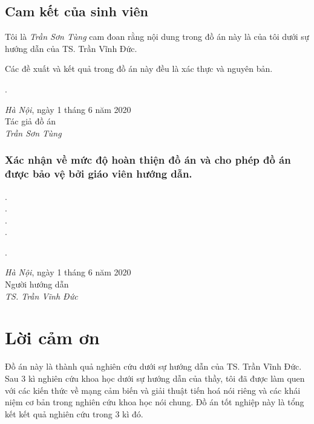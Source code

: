 \documentclass{hust}
\begin{document}
\newpage

\section*{Cam kết của sinh viên}
Tôi là \textit{Trần Sơn Tùng} cam đoan rằng nội dung trong đồ án này là của tôi dưới sự hướng dẫn của TS. Trần Vĩnh Đức.

Các đề xuất và kết quả trong đồ án này đều là xác thực và nguyên bản.
\begin{minipage}{0.5\textwidth}
	.
\end{minipage}
\begin{minipage}[t]{0.5\textwidth}
	
	
	
	\begin{center}
		\textit{Hà Nội}, ngày 1 tháng 6 năm 2020\\
		Tác giả đồ án\\[3cm]
		
		\textit{Trần Sơn Tùng}
	\end{center}
\end{minipage}
\subsection*{Xác nhận về mức độ hoàn thiện đồ án và cho phép đồ án được bảo vệ bởi giáo viên hướng dẫn.}
.\dotfill \\
.\dotfill \\ 
.\dotfill \\ 
.\dotfill \\
\begin{minipage}{0.5\textwidth}
	.
\end{minipage}
\begin{minipage}[t]{0.5\textwidth}
	
	\begin{center}
		\textit{Hà Nội}, ngày 1 tháng 6 năm 2020\\
		Người hướng dẫn\\[3cm]
		
		\textit{TS. Trần Vĩnh Đức}
	\end{center}
\end{minipage}

\pagebreak

\chapter*{Lời cảm ơn}
Đồ án này là thành quả nghiên cứu dưới sự hướng dẫn của TS. Trần Vĩnh Đức. Sau 3 kì nghiên cứu khoa học dưới sự hướng dẫn của thầy, tôi đã được làm quen với các kiến thức về mạng cảm biến và giải thuật tiến hoá nói riêng và các khái niệm cơ bản trong nghiên cứu khoa học nói chung. Đồ án tốt nghiệp này là tổng kết kết quả nghiên cứu trong 3 kì đó.
\end{document}
